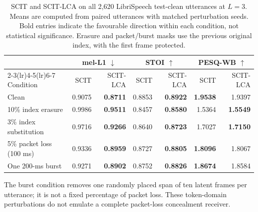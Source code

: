 \begin{table}[t]
\centering
\caption{SCIT and SCIT-LCA on all 2,620 LibriSpeech test-clean utterances at $L=3$. Means are computed from paired utterances with matched perturbation seeds. Bold entries indicate the favourable direction within each condition, not statistical significance. Erasure and packet/burst masks use the previous original index, with the first frame protected.}
\label{tab:rv2-robustness}
\small\setlength{\tabcolsep}{6pt}
\begin{tabular}{lrrrrrr}
\toprule
& \multicolumn{2}{c}{mel-L1 $\downarrow$} & \multicolumn{2}{c}{STOI $\uparrow$} & \multicolumn{2}{c}{PESQ-WB $\uparrow$}\\
\cmidrule(lr){2-3}\cmidrule(lr){4-5}\cmidrule(lr){6-7}
Condition & SCIT & SCIT-LCA & SCIT & SCIT-LCA & SCIT & SCIT-LCA\\
\midrule
Clean & 0.9075 & \textbf{0.8711} & 0.8853 & \textbf{0.8922} & \textbf{1.9538} & 1.9397\\
10\% index erasure & 0.9986 & \textbf{0.9511} & 0.8457 & \textbf{0.8580} & 1.5364 & \textbf{1.5549}\\
3\% index substitution & 0.9716 & \textbf{0.9266} & 0.8640 & \textbf{0.8723} & 1.7027 & \textbf{1.7150}\\
5\% packet loss (100 ms) & 0.9336 & \textbf{0.8959} & 0.8727 & \textbf{0.8805} & \textbf{1.8096} & 1.8067\\
One 200-ms burst & 0.9271 & \textbf{0.8902} & 0.8752 & \textbf{0.8826} & \textbf{1.8674} & 1.8584\\
\bottomrule
\end{tabular}
\par\smallskip
\parbox{\textwidth}{\footnotesize The burst condition removes one randomly placed span of ten latent frames per utterance; it is not a fixed percentage of packet loss. These token-domain perturbations do not emulate a complete packet-loss concealment receiver.}
\end{table}
